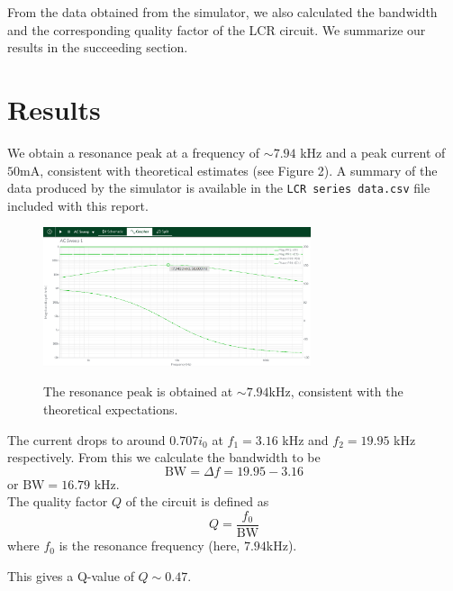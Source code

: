 \documentclass{article}
\begin{document}
	From the data obtained from the simulator, we also calculated the bandwidth and the corresponding quality factor of the LCR circuit. We summarize our results in the succeeding section.

	\section*{Results}
	
	We obtain a resonance peak at a frequency of $\sim 7.94$ kHz and a peak current of $50$mA, consistent with theoretical estimates (see Figure 2). A summary of the data produced by the simulator is available in the \texttt{LCR series data.csv} file included with this report.\\
	
	
	\begin{figure}[h!]
		\centering
		\includegraphics[width=0.7\textwidth]{../resonance_current}
		\label{fig:peak}
		\caption{The resonance peak is obtained at $\sim 7.94$kHz, consistent with the theoretical expectations.}
	\end{figure}

	The current drops to around $0.707 i_0$ at $f_1 = 3.16$ kHz and $f_2 = 19.95$ kHz respectively. From this we calculate the bandwidth to be
	$$ \mathrm{BW} = \Delta f = 19.95-3.16$$
	or $\mathrm{BW} = 16.79$ kHz.\\
	
	The quality factor $Q$ of the circuit is defined as $$ Q = \frac{f_0}{\mathrm{BW}}$$
	where $f_0$ is the resonance frequency (here, $7.94$kHz).
	
	This gives a Q-value of $Q \sim 0.47$.
	
\end{document}
